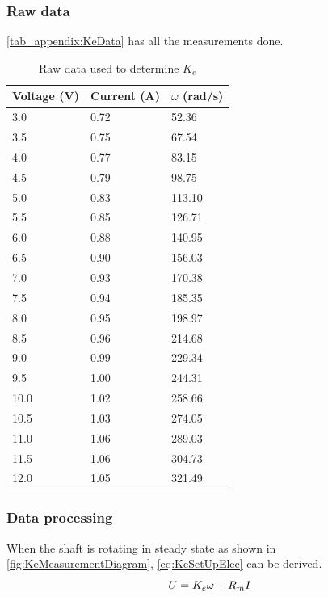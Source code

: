 \subsubsection*{Raw data}
\autoref{tab_appendix:KeData} has all the measurements done.
\begin{table}[htbp]
	\centering
	\caption{Raw data used to determine $K_e$}\label{tab_appendix:KeData}
	\begin{tabularx}{0.55\textwidth}{lXX}
		Voltage (V) & Current (A) & $\omega$ (rad/s)\\ \toprule \rowcolor{lightGrey}
		3.0  & 0.72 & 52.36  \\
		3.5  & 0.75 & 67.54  \\ \rowcolor{lightGrey}
		4.0  & 0.77 & 83.15  \\
		4.5  & 0.79 & 98.75  \\ \rowcolor{lightGrey}
		5.0  & 0.83 & 113.10 \\
		5.5  & 0.85 & 126.71 \\ \rowcolor{lightGrey}
		6.0  & 0.88 & 140.95 \\
		6.5  & 0.90 & 156.03 \\ \rowcolor{lightGrey}
		7.0  & 0.93 & 170.38 \\
		7.5  & 0.94 & 185.35 \\ \rowcolor{lightGrey}
		8.0  & 0.95 & 198.97 \\
		8.5  & 0.96 & 214.68 \\ \rowcolor{lightGrey}
		9.0  & 0.99 & 229.34 \\
		9.5  & 1.00 & 244.31 \\ \rowcolor{lightGrey}
		10.0 & 1.02 & 258.66 \\
		10.5 & 1.03 & 274.05 \\ \rowcolor{lightGrey}
		11.0 & 1.06 & 289.03 \\
		11.5 & 1.06 & 304.73 \\ \rowcolor{lightGrey}
		12.0 & 1.05 & 321.49
	\end{tabularx}
\end{table}

\subsubsection*{Data processing}

When the shaft is rotating in steady state as shown in \autoref{fig:KeMeasurementDiagram}, \autoref{eq:KeSetUpElec} can be derived.
\begin{equation}
U=K_e\omega+R_m I \addunit{\volt}
\label{eq:KeSetUpElec}
\end{equation}


